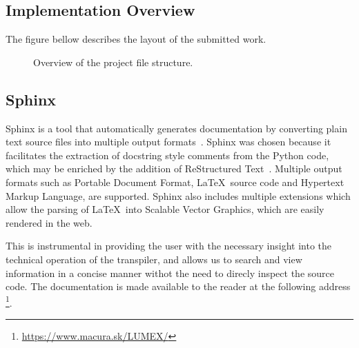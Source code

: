 \subsection{Implementation Overview}

The figure bellow describes the layout of the submitted work. 

\begin{figure}[H]\label{fig:project-structure}
\centering
{}

\caption{Overview of the project file structure.}
\end{figure}

\subsection{Sphinx}
Sphinx is a tool that automatically generates documentation by converting plain text source files into multiple output formats~\cite{sphinx_quickstart}. Sphinx was chosen because it facilitates the extraction of docstring style comments from the Python code, which may be enriched by the addition of ReStructured Text~\cite{docutils_rst}. Multiple output formats such as Portable Document Format, \LaTeX \ source code and Hypertext Markup Language, are supported. Sphinx also includes multiple extensions which allow the parsing of \LaTeX \ into Scalable Vector Graphics, which are easily rendered in the web.

This is instrumental in providing the user with the necessary insight into the technical operation of the transpiler, and allows us to search and view information in a concise manner withot the need to direcly inspect the source code. The documentation is made available to the reader at the following address \footnote{\url{https://www.macura.sk/LUMEX/}}.

